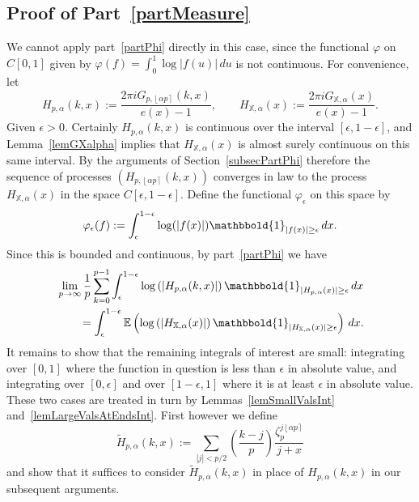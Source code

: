 \documentclass[reqno]{amsart}
\numberwithin{equation}{section}
\numberwithin{table}{section}
\numberwithin{figure}{section}
\newcommand{\leg}[2]{\left(\frac{#1}{#2}\right)}
\newcommand{\abs}[1]{\left\lvert#1\right\rvert}
\newcommand{\round}[1]{\left\lfloor#1\right\rceil}
\begin{document}
\subsection{Proof of Part~\ref{partMeasure}}\label{subsecPartMeasure}
We cannot apply part~\ref{partPhi} directly in this case, since the functional $\varphi$ on $C[0,1]$ given by $\varphi(f) = \int_0^1 \log\abs{f(u)}\,du$ is not continuous.
For convenience, let
\begin{equation}\label{eqnHdefn}
H_{p,\alpha}(k,x) := \frac{2\pi i G_{p,\round{\alpha p}}(k,x)}{e(x)-1},
\qquad
H_{\mathbb{X},\alpha}(x) := \frac{2\pi i G_{\mathbb{X},\alpha}(x)}{e(x)-1}.
\end{equation}
Given $\epsilon>0$.
Certainly $H_{p,\alpha}(k,x)$ is continuous over the interval $[\epsilon,1-\epsilon]$, and Lemma~\ref{lemGXalpha} implies that $H_{\mathbb{X},\alpha}(x)$ is almost surely continuous on this same interval.
By the arguments of Section~\ref{subsecPartPhi} therefore the sequence of processes $(H_{p,\round{\alpha p}}(k,x))$ converges in law to the process $H_{\mathbb{X},\alpha}(x)$ in the space $C[\epsilon,1-\epsilon]$.
Define the functional $\varphi_\epsilon$ on this space by
\[
\varphi_\epsilon(f) := \int_\epsilon^{1-\epsilon} \log(\abs{f(x)}) \mathbbold{1}_{\abs{f(x)}\geq\epsilon}\,dx.
\]
Since this is bounded and continuous, by part~\ref{partPhi} we have
\begin{equation}\label{eqnHmost}
\begin{split}
&\lim_{p\to\infty} \frac{1}{p} \sum_{k=0}^{p-1} \int_\epsilon^{1-\epsilon} \log\left(\abs{H_{p,\alpha}(k,x)}\right) \mathbbold{1}_{\abs{H_{p,\alpha}(x)}\geq\epsilon}\,dx\\
&\qquad =
 \int_\epsilon^{1-\epsilon} \mathbb{E}\left(\log\left(\abs{H_{\mathbb{X},\alpha}(x)} \right)\mathbbold{1}_{\abs{H_{\mathbb{X},\alpha}(x)}\geq\epsilon}\right)\,dx.
\end{split}
\end{equation}
It remains to show that the remaining integrals of interest are small: integrating over $[0,1]$ where the function in question is less than $\epsilon$ in absolute value, and integrating over $[0,\epsilon]$ and over $[1-\epsilon,1]$ where it is at least $\epsilon$ in absolute value.
These two cases are treated in turn by Lemmas~\ref{lemSmallValsInt} and~\ref{lemLargeValsAtEndsInt}.
First however we define
\[
\widetilde{H}_{p,\alpha}(k,x) := \sum_{\abs{j}<p/2} \leg{k-j}{p} \frac{\zeta_p^{j\round{\alpha p}}}{j+x}
\]
and show that it suffices to consider $\widetilde{H}_{p,\alpha}(k,x)$ in place of $H_{p,\alpha}(k,x)$ in our subsequent arguments.
\end{document}

